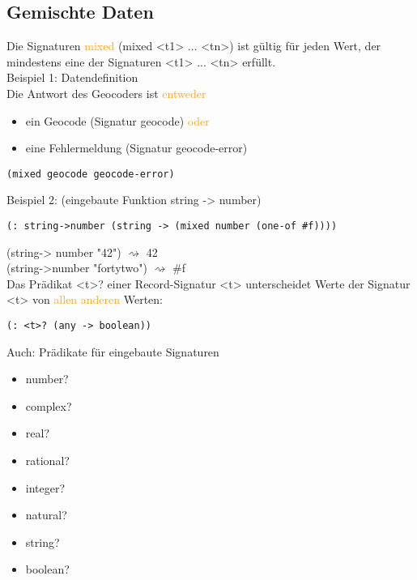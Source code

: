 \documentclass[paper=a4, fontsize=11pt]{scrartcl}
\numberwithin{equation}{section}
\numberwithin{figure}{section}
\numberwithin{table}{section}
\begin{document}
\subsection{Gemischte Daten}
Die Signaturen \textcolor{orange}{mixed} (mixed <t1> ... <tn>) ist gültig für jeden Wert, der mindestens eine der Signaturen <t1> ... <tn> erfüllt. \\
Beispiel 1: Datendefinition \\
Die Antwort des Geocoders ist \textcolor{orange}{entweder} \\
\begin{itemize}
\item ein Geocode (Signatur geocode) \textcolor{orange}{oder} 
\item eine Fehlermeldung (Signatur geocode-error)
\end{itemize}
\begin{lstlisting}
(mixed geocode geocode-error)
\end{lstlisting}

Beispiel 2: (eingebaute Funktion string -> number) 
\begin{lstlisting}
(: string->number (string -> (mixed number (one-of #f))))
\end{lstlisting}
(string-> number "42") $\rightsquigarrow$ 42 \\
(string->number "fortytwo") $\rightsquigarrow$ \#f \\
Das Prädikat <t>? einer Record-Signatur <t> unterscheidet Werte der Signatur <t> von \textcolor{orange}{allen anderen } Werten:
\begin{lstlisting}
(: <t>? (any -> boolean))
\end{lstlisting}
Auch: Prädikate für eingebaute Signaturen \\
\begin{itemize}
\item number?
\item complex?
\item real?
\item rational?
\item integer?
\item natural?
\item string?
\item boolean?
\end{itemize}
\end{document}
